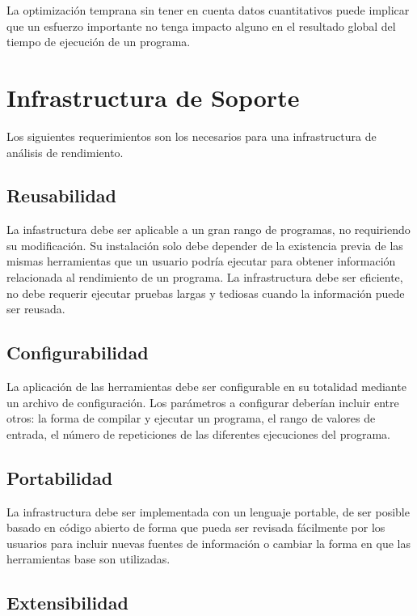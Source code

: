 \documentclass[a4paper]{report}
\begin{document}
La optimización temprana sin tener en cuenta datos cuantitativos puede implicar que un esfuerzo importante no tenga impacto alguno en el resultado global del tiempo de ejecución de un programa.

\section{Infrastructura de Soporte}

Los siguientes requerimientos son los necesarios para una infrastructura de análisis de rendimiento.

\subsection{Reusabilidad}

La infastructura debe ser aplicable a un gran rango de programas, no requiriendo su modificación.
Su instalación solo debe depender de la existencia previa de las mismas herramientas que un usuario podría ejecutar para obtener información relacionada al rendimiento de un programa. La infrastructura debe ser eficiente, no debe requerir ejecutar pruebas largas y tediosas cuando la información puede ser reusada.

\subsection{Configurabilidad}

La aplicación de las herramientas debe ser configurable en su totalidad mediante un archivo de configuración.
Los parámetros a configurar deberían incluir entre otros: la forma de compilar y ejecutar un programa, el rango de valores de entrada, el número de repeticiones de las diferentes ejecuciones del programa.

\subsection{Portabilidad}

La infrastructura debe ser implementada con un lenguaje portable, de ser posible basado en código abierto de forma que pueda ser revisada fácilmente por los usuarios para incluir nuevas fuentes de información o cambiar la forma en que las herramientas base son utilizadas.

\subsection{Extensibilidad}
\end{document}
